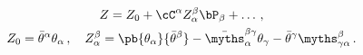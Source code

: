 \begin{equation}
  \begin{gathered}
    Z=Z_0+\cC^\alpha Z_\alpha^\beta \bP_\beta+\ldots\,, \\
    Z_0=\bar\theta^\alpha \theta_\alpha\,, \quad
     Z_\alpha^\beta
    =\pb{\theta_\alpha}{\bar\theta^\beta} 
       -{\bar \myths}^{\beta \gamma}_\alpha  \theta_\gamma
       -\bar\theta^\gamma \myths^\beta_{\gamma\alpha}\,.
\end{gathered}
\end{equation}

